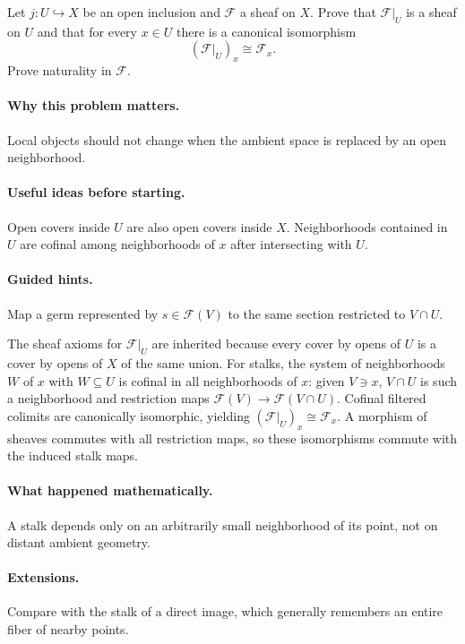 \begin{problem}
Let $j:U\hookrightarrow X$ be an open inclusion and $\mathcal F$ a sheaf on $X$. Prove that $\mathcal F|_U$ is a sheaf on $U$ and that for every $x\in U$ there is a canonical isomorphism
\[
(\mathcal F|_U)_x\cong\mathcal F_x.
\]
Prove naturality in $\mathcal F$.
\end{problem}

\paragraph{Why this problem matters.}
Local objects should not change when the ambient space is replaced by an open neighborhood.

\paragraph{Useful ideas before starting.}
Open covers inside $U$ are also open covers inside $X$. Neighborhoods contained in $U$ are cofinal among neighborhoods of $x$ after intersecting with $U$.

\paragraph{Guided hints.}
Map a germ represented by $s\in\mathcal F(V)$ to the same section restricted to $V\cap U$.

\ifdefined\FullProblemDossiers
\begin{solution}
The sheaf axioms for $\mathcal F|_U$ are inherited because every cover by opens of $U$ is a cover by opens of $X$ of the same union. For stalks, the system of neighborhoods $W$ of $x$ with $W\subseteq U$ is cofinal in all neighborhoods of $x$: given $V\ni x$, $V\cap U$ is such a neighborhood and restriction maps $\mathcal F(V)\to\mathcal F(V\cap U)$. Cofinal filtered colimits are canonically isomorphic, yielding $(\mathcal F|_U)_x\cong\mathcal F_x$. A morphism of sheaves commutes with all restriction maps, so these isomorphisms commute with the induced stalk maps.
\end{solution}

\paragraph{What happened mathematically.}
A stalk depends only on an arbitrarily small neighborhood of its point, not on distant ambient geometry.

\paragraph{Extensions.}
Compare with the stalk of a direct image, which generally remembers an entire fiber of nearby points.
\fi
